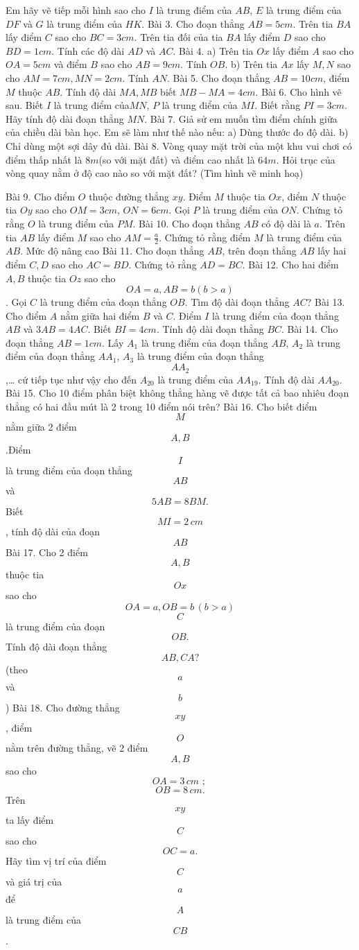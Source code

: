 Em hãy vẽ tiếp mỗi hình sao cho $I$ là trung điểm của $AB$, $E$ là trung điểm của $DF$ và $G$ là trung điểm của $HK$.
Bài 3. Cho đoạn thẳng $AB=5cm$. Trên tia $BA$ lấy điểm $C$ sao cho $BC=3cm$. Trên tia đối của tia $BA$ lấy điểm $D$ sao cho $BD=1cm$. Tính các độ dài $AD$ và $AC$.
Bài 4. 
a) Trên tia $Ox$ lấy điểm $A$ sao cho $OA=5cm$ và điểm $B$ sao cho $AB=9cm$. Tính $OB$.
b) Trên tia $Ax$ lấy $M,N$ sao cho $AM=7cm,MN=2cm$. Tính $AN$.
Bài 5. Cho đoạn thẳng $AB=10cm$, điểm $M$ thuộc $AB$. Tính độ dài $MA,MB$ biết $MB-MA=4cm$.
Bài 6. Cho hình vẽ sau. Biết $I$ là trung điểm của$MN$, $P$ là trung điểm của $MI$. Biết rằng $PI=3cm$. Hãy tính độ dài đoạn thẳng $MN$.
Bài 7. Giả sử em muốn tìm điểm chính giữa của chiều dài bàn học. Em sẽ làm như thế nào nếu:
a) Dùng thước đo độ dài.
b) Chỉ dùng một sợi dây đủ dài.
Bài 8. Vòng quay mặt trời của một khu vui chơi có điểm thấp nhất là $8m$(so với mặt đất) và điểm cao nhất là $64m$. Hỏi trục của vòng quay nằm ở độ cao nào so với mặt đất? (Tìm hình vẽ minh hoạ)

Bài 9. Cho điểm $O$ thuộc đường thẳng $xy$. Điểm $M$ thuộc tia $Ox$, điểm $N$ thuộc tia $Oy$ sao cho $OM=3cm$, $ON=6cm$. Gọi $P$ là trung điểm của $ON$. Chứng tỏ rằng $O$ là trung điểm của $PM$.
Bài 10. Cho đoạn thẳng $AB$ có độ dài là $a$. Trên tia $AB$ lấy điểm $M$ sao cho $AM=\frac{a}{2}$. Chứng tỏ rằng điểm $M$ là trung điểm của $AB$.
Mức độ nâng cao
Bài 11. Cho đoạn thẳng $AB$, trên đoạn thẳng $AB$ lấy hai điểm $C,D$ sao cho $AC=BD$. Chứng tỏ rằng $AD=BC$.
Bài 12. Cho hai điểm $A,B$ thuộc tia $Oz$ sao cho \[OA=a,AB=b\left( b>a \right)\]. Gọi $C$ là trung điểm của đoạn thẳng $OB$. Tìm độ dài đoạn thẳng $AC$?
Bài 13. Cho điểm $A$ nằm giữa hai điểm $B$ và $C$. Điểm $I$ là trung điểm của đoạn thẳng $AB$ và $3AB=4AC$. Biết $BI=4cm$. Tính độ dài đoạn thẳng $BC$.
Bài 14. Cho đoạn thẳng $AB=1cm$. Lấy ${{A}_{1}}$ là trung điểm của đoạn thẳng $AB$, ${{A}_{2}}$ là trung điểm của đoạn thẳng $A{{A}_{1}}$, ${{A}_{3}}$ là trung điểm của đoạn thẳng \[A{{A}_{2}}\],… cứ tiếp tục như vậy cho đến ${{A}_{20}}$ là trung điểm của $A{{A}_{19}}$. Tính độ dài $A{{A}_{20}}$.
Bài 15. Cho 10 điểm phân biệt không thẳng hàng vẽ được tất cả bao nhiêu đoạn thẳng có hai đầu mút là 2 trong 10 điểm nói trên?
Bài 16. Cho biết điểm\[M\]nằm giữa 2 điểm\[A,B\].Điểm \[I\]là trung điểm của đoạn thẳng\[AB\] và \[5AB=8BM.\] Biết \[MI=2\,cm\], tính độ dài của đoạn\[AB\]
Bài 17. Cho 2 điểm\[A,B\]thuộc tia \[Ox\] sao cho \[OA=a,OB=b\,(b>a)\]
\[C\]là trung điểm của đoạn\[OB.\] Tính độ dài đoạn thẳng \[AB,CA?\](theo \[a\] và \[b\])
Bài 18. Cho đường thẳng \[xy\], điểm \[O\] nằm trên đường thẳng, vẽ 2 điểm \[A,B\]sao cho \[OA=3\,cm\,\,;\,\]\[OB=8\,cm.\] Trên \[xy\] ta lấy điểm \[C\] sao cho \[OC=a.\] Hãy tìm vị trí của điểm \[C\]và giá trị của \[a\] để \[A\] là trung điểm của \[CB\].

